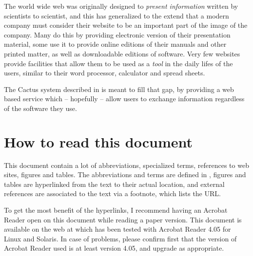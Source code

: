 The world wide web was originally designed to \textit{present
  information} written by scientists to scientist, and this has
generalized to the extend that a modern company must consider their
website to be an important part of the image of the company.  Many do
this by providing electronic version of their presentation material,
some use it to provide online editions of their manuals and other
printed matter, as well as downloadable editions of software.  Very
few websites provide facilities that allow them to be used as a
\textit{tool} in the daily lifes of the users, similar to their word
processor, calculator and spread sheets.

The Cactus system described in  is meant to fill
that gap, by providing a web based service which -- hopefully -- allow
users to exchange information regardless of the software they use.






\section{How to read this document}
\label{sec:how-to-read-this-document}

This document contain a lot of abbreviations, specialized terms,
references to web sites, figures and tables.  The abbreviations and
terms are defined in , figures and
tables are hyperlinked from the text to their actual location, and
external references are associated to the text via a footnote, which
lists the URL.


To get the most benefit of the hyperlinks, I recommend having an
Acrobat Reader open on this document while reading a paper version.
This document is available on the web at
which has been tested with Acrobat Reader 4.05 for Linux and
Solaris.  In case of problems, please confirm first that the version
of Acrobat Reader used is at least version 4.05, and upgrade as
appropriate. 




